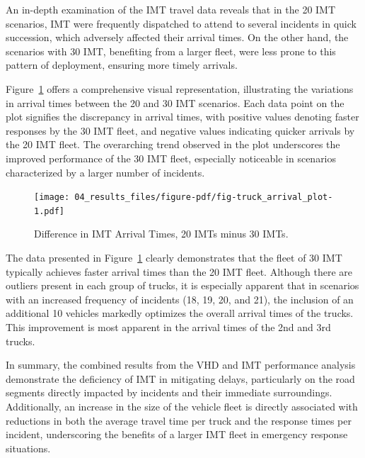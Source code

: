 \documentclass[fancy, oneside, mastersfancy, ms]{byuthesis}
\begin{document}
An in-depth examination of the IMT travel data reveals that in the 20
IMT scenarios, IMT were frequently dispatched to attend to several
incidents in quick succession, which adversely affected their arrival
times. On the other hand, the scenarios with 30 IMT, benefiting from a
larger fleet, were less prone to this pattern of deployment, ensuring
more timely arrivals.

Figure~\ref{fig-truck_arrival_plot} offers a comprehensive visual
representation, illustrating the variations in arrival times between the
20 and 30 IMT scenarios. Each data point on the plot signifies the
discrepancy in arrival times, with positive values denoting faster
responses by the 30 IMT fleet, and negative values indicating quicker
arrivals by the 20 IMT fleet. The overarching trend observed in the plot
underscores the improved performance of the 30 IMT fleet, especially
noticeable in scenarios characterized by a larger number of incidents.

\begin{figure}

{\centering \texttt{[image: 04\_results\_files/figure-pdf/fig-truck\_arrival\_plot-1.pdf]}

}

\caption{\label{fig-truck_arrival_plot}Difference in IMT Arrival Times,
20 IMTs minus 30 IMTs.}

\end{figure}

The data presented in Figure~\ref{fig-truck_arrival_plot} clearly
demonstrates that the fleet of 30 IMT typically achieves faster arrival
times than the 20 IMT fleet. Although there are outliers present in each
group of trucks, it is especially apparent that in scenarios with an
increased frequency of incidents (18, 19, 20, and 21), the inclusion of
an additional 10 vehicles markedly optimizes the overall arrival times
of the trucks. This improvement is most apparent in the arrival times of
the 2nd and 3rd trucks.

In summary, the combined results from the VHD and IMT performance
analysis demonstrate the deficiency of IMT in mitigating delays,
particularly on the road segments directly impacted by incidents and
their immediate surroundings. Additionally, an increase in the size of
the vehicle fleet is directly associated with reductions in both the
average travel time per truck and the response times per incident,
underscoring the benefits of a larger IMT fleet in emergency response
situations.
\end{document}
